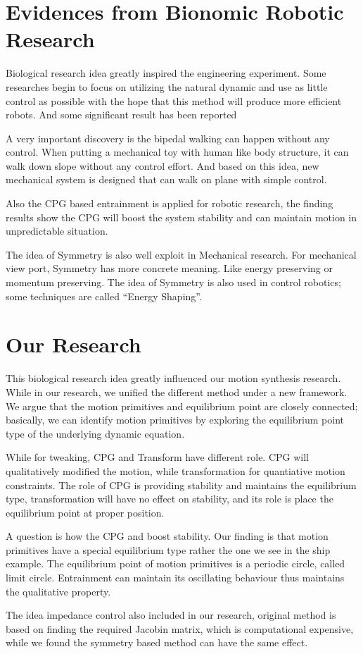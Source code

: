 \section{ Evidences from Bionomic Robotic Research}
Biological research idea greatly inspired the engineering experiment.
Some researches begin to focus on utilizing the natural dynamic and use as little control as possible with the hope that this method will produce more efficient robots. 
And some significant result has been reported
\begin{itemize}
A very important discovery is the bipedal walking can happen without any control\citep{McGeer1990}. 
When putting a mechanical toy with human like body structure, it can walk down slope without any control effort. 
And based on this idea, new mechanical system is designed that can walk on plane with simple control\citep{Collins2005}.

Also the CPG based entrainment is applied for robotic research\citep{Williamson1999a}, the finding results show the CPG will boost the system stability and can maintain motion in unpredictable situation.

The idea of Symmetry is also well exploit in Mechanical research.
For mechanical view port, Symmetry has more concrete meaning.
Like energy preserving or momentum preserving.
The idea of Symmetry is also used in control robotics\citep{spong2005controlled}; some techniques are called “Energy Shaping”.
\end{itemize}

\section{Our Research}
This biological research idea greatly influenced our motion synthesis research.
While in our research, we unified the different method under a new framework.
We argue that the motion primitives and equilibrium point are closely connected; basically, we can identify motion primitives by exploring the equilibrium point type of the underlying dynamic equation. 

While for tweaking, CPG and Transform have different role. 
CPG will qualitatively modified the motion, while transformation for quantiative motion constraints.
The role of CPG is providing stability and maintains the equilibrium type, transformation will have no effect on stability, and its role is place the equilibrium point at proper position.

A question is how the CPG and boost stability. 
Our finding is that motion primitives have a special equilibrium type rather the one we see in the ship example.
The equilibrium point of motion primitives is a periodic circle, called limit circle. 
Entrainment can maintain its oscillating behaviour thus maintains the qualitative property.

The idea impedance control also included in our research, original method is based on finding the required Jacobin matrix, which is computational expensive, while we found the symmetry based method can have the same effect.
